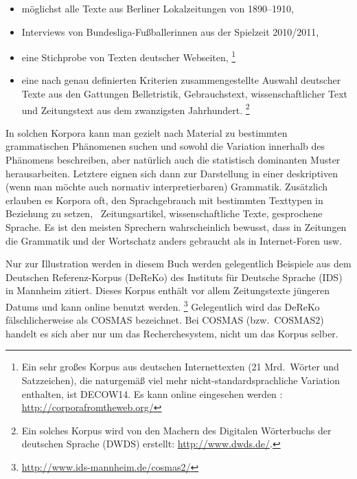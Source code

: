 
\begin{itemize}\Lf
  \item möglichst alle Texte aus Berliner Lokalzeitungen von 1890--1910,
  \item Interviews von Bundesliga-Fußballerinnen aus der Spielzeit 2010\slash 2011,
  \item eine Stichprobe von Texten deutscher Webseiten,%
		\footnote{Ein sehr großes Korpus aus deutschen Internettexten (21 Mrd.\ Wörter und Satzzeichen), die naturgemäß viel mehr nicht-standardsprachliche Variation enthalten, ist DECOW14.
		Es kann online eingesehen werden \citep{SchaeferBildhauer2012a}: \url{http://corporafromtheweb.org/}}
  \item eine nach genau definierten Kriterien zusammengestellte Auswahl deutscher Texte aus den Gattungen Belletristik, Gebrauchstext, wissenschaftlicher Text und Zeitungstext aus dem zwanzigsten Jahrhundert.%
		\footnote{Ein solches Korpus wird von den Machern des Digitalen Wörterbuchs der deutschen Sprache (DWDS) erstellt: \url{http://www.dwds.de/}.}
\end{itemize}

In solchen Korpora kann man gezielt nach Material zu bestimmten grammatischen Phänomenen suchen und sowohl die Variation innerhalb des Phänomens beschreiben, aber natürlich auch die statistisch dominanten Muster herausarbeiten.
Letztere eignen sich dann zur Darstellung in einer deskriptiven (wenn man möchte auch normativ interpretierbaren) Grammatik.
Zusätzlich erlauben es Korpora oft, den Sprachgebrauch mit bestimmten Texttypen in Beziehung zu setzen, \zB\ Zeitungsartikel, wissenschaftliche Texte, gesprochene Sprache.
Es ist den meisten Sprechern wahrscheinlich bewusst, dass in Zeitungen die Grammatik und der Wortschatz anders gebraucht als in Internet-Foren usw.

Nur zur Illustration werden in diesem Buch werden gelegentlich Beispiele aus dem Deutschen Referenz-Korpus (DeReKo) des Instituts für Deutsche Sprache (IDS) in Mannheim zitiert.
Dieses Korpus enthält vor allem Zeitungstexte jüngeren Datums und kann online benutzt werden.%
\footnote{\url{http://www.ids-mannheim.de/cosmas2/}}
Gelegentlich wird das DeReKo fälschlicherweise als COSMAS bezeichnet.
Bei COSMAS (bzw.\ COSMAS2) handelt es sich aber nur um das Recherchesystem, nicht um das Korpus selber.


